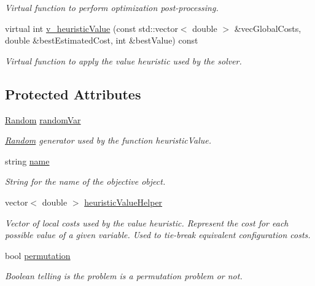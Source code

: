 \begin{DoxyCompactItemize}
\begin{DoxyCompactList}\small\item\em Virtual function to perform optimization post-\/processing. \end{DoxyCompactList}\item 
virtual int \hyperlink{classghost_1_1Objective_a03311ba62213580f1664f164e5f5696a}{v\+\_\+heuristic\+Value} (const std\+::vector$<$ double $>$ \&vec\+Global\+Costs, double \&best\+Estimated\+Cost, int \&best\+Value) const 
\begin{DoxyCompactList}\small\item\em Virtual function to apply the value heuristic used by the solver. \end{DoxyCompactList}\end{DoxyCompactItemize}
\subsection*{Protected Attributes}
\begin{DoxyCompactItemize}
\item 
\hyperlink{classghost_1_1Random}{Random} \hyperlink{classghost_1_1Objective_a442da333edc70f47c33a15987c2a81b8}{random\+Var}
\begin{DoxyCompactList}\small\item\em \hyperlink{classghost_1_1Random}{Random} generator used by the function heuristic\+Value. \end{DoxyCompactList}\item 
string \hyperlink{classghost_1_1Objective_ae9533a52b3600c826df6e20c65db1e7a}{name}
\begin{DoxyCompactList}\small\item\em String for the name of the objective object. \end{DoxyCompactList}\item 
vector$<$ double $>$ \hyperlink{classghost_1_1Objective_a9bfe64f13de15bba7f2fa3a662c02e27}{heuristic\+Value\+Helper}
\begin{DoxyCompactList}\small\item\em Vector of local costs used by the value heuristic. Represent the cost for each possible value of a given variable. Used to tie-\/break equivalent configuration costs. \end{DoxyCompactList}\item 
bool \hyperlink{classghost_1_1Objective_aae8345f4b7981f4b386eb58e447e0286}{permutation}
\begin{DoxyCompactList}\small\item\em Boolean telling is the problem is a permutation problem or not. \end{DoxyCompactList}\end{DoxyCompactItemize}


